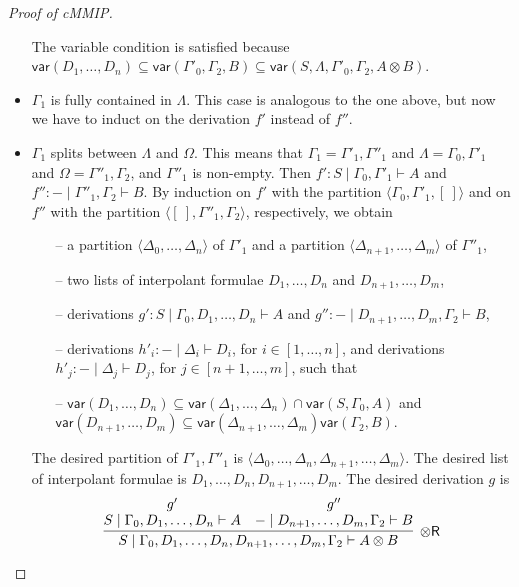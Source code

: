 \documentclass[sn-mathphys-num]{sn-jnl}%
\newcommand{\GG}{\Gamma}
\newcommand{\GD}{\Delta}
\newcommand{\GL}{\Lambda}
\newcommand{\GO}{\Omega}
\newcommand{\vd}{\vdash}
\newcommand{\tr}{\otimes\mathsf{R}}
\newcommand{\ot}{\otimes}
\newcommand{\mf}[1]{\mathsf{#1}}
\newcommand{\gs}[1]{\sigma_{X} (#1)}
\newcommand{\vars}[1]{\mf{var} (#1)}
\newcommand{\cMMIP}{\textsf{cMMIP}}
\theoremstyle{thmstyleone}%
\theoremstyle{thmstyletwo}%
\theoremstyle{thmstylethree}%
\begin{document}
\begin{proof}[Proof of \cMMIP]
\begin{itemize}
    The variable condition is satisfied because $\vars{D_1 , \dots , D_n} \subseteq \vars{ \GG'_0 , \GG_2 , B} \subseteq \vars{S, \GL, \GG'_0 , \GG_2 , A \ot B}$.
    \item $\GG_1$ is fully contained in $\GL$. This case is analogous to the one above, but now we have to induct on the derivation $f'$ instead of $f''$.
    \item $\GG_1$ splits between $\GL$ and $\GO$.
    This means that $\GG_1 = \GG'_1 , \GG''_1$ and $\GL = \GG_0 , \GG'_1$ and $\GO = \GG''_1 , \GG_2$, and $\GG''_1$ is non-empty.
    Then $f' : S \mid \GG_0,\GG'_1 \vd A$ and $f'' : {-} \mid \GG''_1,\GG_2 \vd B$.
    By induction on $f'$ with the partition $\langle \GG_0, \GG'_1,[\ ] \rangle$ and on $f''$ with the partition $\langle [\ ],\GG''_1,\GG_2 \rangle$, respectively, we obtain
    \begin{itemize}
      \item[--] a partition $\langle \GD_0, \dots , \GD_n \rangle$ of $\GG'_1$ and a partition $\langle \GD_{n+1}, \dots , \GD_m \rangle$ of $\GG''_1$,
      \item[--] two lists of interpolant formulae $D_1, \dots , D_n$ and $D_{n+1}, \dots , D_m$,
      \item[--] derivations $g' : S \mid \GG_0 , D_1 , \dots , D_n \vd A$ and $g'' : {-} \mid D_{n+1} , \dots , D_{m} , \GG_2 \vd B$,
      \item[--] derivations $h'_i : {-} \mid \GD_i \vd D_i$, for $i \in [1,\dots , n]$, and derivations $h'_j : {-} \mid \GD_j \vd D_j$, for $j \in [n+1,\dots , m]$, such that
      \item[--] $\vars{D_1 , \dots , D_n} \subseteq \vars{\GD_1 , \dots , \GD_n} \cap \vars{ S, \GG_0 , A}$ and $\vars{D_{n+1} , \dots , D_{m}} \subseteq \vars{\GD_{n+1} , \dots , \GD_m}\vars{\GG_2 , B}$.
    \end{itemize}
    The desired partition of $\GG'_1,\GG''_1$ is $\langle \GD_0, \dots , \GD_n, \GD_{n+1}, \dots , \GD_m \rangle$.
    The desired list of interpolant formulae is $D_1, \dots , D_n,D_{n+1}, \dots , D_m$.
    The desired derivation $g$ is
    \begin{displaymath}
      \infer[\tr]{S \mid \GG_0 , D_1 , \dots , D_n , D_{n+1} , \dots , D_{m}, \GG_2 \vd A \ot B}{
      \deduce{S \mid \GG_0 , D_1 , \dots , D_n \vd A}{g'}
      &
      \deduce{{-} \mid D_{n+1} , \dots , D_{m}, \GG_2 \vd B}{g''}
}
\end{displaymath}
\end{itemize}
\end{proof}
\end{document}
